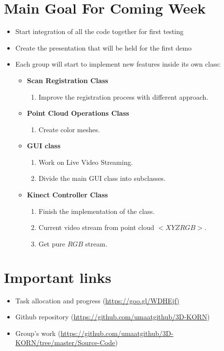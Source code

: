 \documentclass[11pt]{article} %
\begin{document}
\section{Main Goal For Coming Week}

\begin{itemize}

\item Start integration of all the code together for first testing

\item Create the presentation that will be held for the first demo


\item Each group will start to implement new features inside its own class:
\begin{itemize}
	
	\item \textbf{Scan Registration Class} 
	\begin{enumerate}
		\item Improve the registration process with different approach.
	\end{enumerate}
	
	
	\item \textbf{Point Cloud Operations Class}
\begin{enumerate}
	\item Create color meshes.
\end{enumerate}

	\item \textbf{GUI class}
	\begin{enumerate}
		\item Work on Live Video Streaming.
		\item Divide the main GUI class into subclasses.
	\end{enumerate}

	\item \textbf{Kinect Controller Class}
	\begin{enumerate}
		\item Finish the implementation of the class.
		\item Current video stream from point cloud $<XYZRGB>$.
		\item Get pure $RGB$ stream.
	\end{enumerate}
	
\end{itemize}




\end{itemize}

\section{Important links}
\begin{itemize}
\item Task allocation and progress  (\url{https://goo.gl/WDHEjf)}
\item Github repository (\url{https://github.com/umaatgithub/3D-KORN})
\item Group's work (\url{https://github.com/umaatgithub/3D-KORN/tree/master/Source-Code}) 
\end{itemize}
\end{document}
